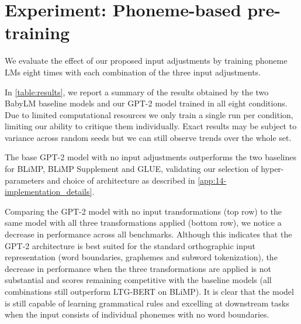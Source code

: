 \section{Experiment: Phoneme-based pre-training}

We evaluate the effect of our proposed input adjustments by training phoneme LMs eight times with each combination of the three input adjustments.

In \cref{table:results}, we report a summary of the results obtained by the two BabyLM baseline models and our \mbox{GPT-2} model trained in all eight conditions. Due to limited computational resources we only train a single run per condition, limiting our ability to critique them individually. Exact results may be subject to variance across random seeds but we can still observe trends over the whole set. 

The base \mbox{GPT-2} model with no input adjustments outperforms the two baselines for BLiMP, BLiMP Supplement and GLUE, validating our selection of hyper-parameters and choice of architecture as described in \cref{app:14-implementation_details}.

Comparing the \mbox{GPT-2} model with no input transformations (top row) to the same model with all three transformations applied (bottom row), we notice a decrease in performance across all benchmarks. Although this indicates that the \mbox{GPT-2} architecture is best suited for the standard orthographic input representation (word boundaries, graphemes and subword tokenization), the decrease in performance when the three transformations are applied is not substantial and scores remaining competitive with the baseline models (all combinations still outperform LTG-BERT on BLiMP). It is clear that the model is still capable of learning grammatical rules and excelling at downstream tasks when the input consists of individual phonemes with no word boundaries. 

